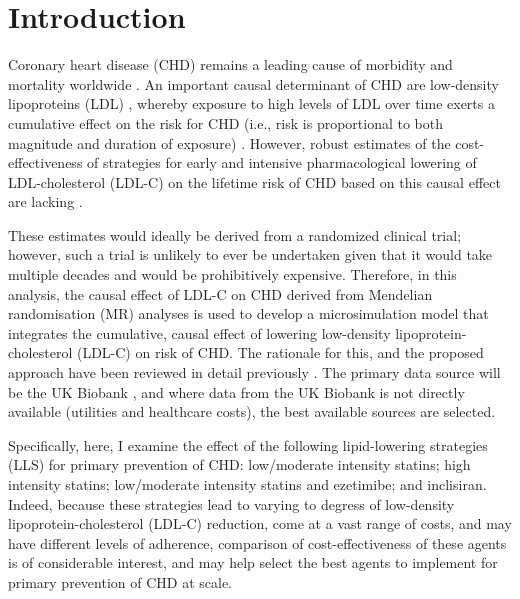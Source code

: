 \documentclass[11pt]{article}
\begin{document}
\pagebreak
\section{Introduction}

Coronary heart disease (CHD) remains a leading cause of morbidity and mortality worldwide \cite{RothJACC2020}.
An important causal determinant of CHD are low-density lipoproteins (LDL) \cite{FerenceEHJ2017}, 
whereby exposure to high levels of LDL over time exerts a cumulative effect on the risk for CHD 
(i.e., risk is proportional to both magnitude and duration of exposure) \cite{FerenceJAMA2019}.
However, robust estimates of the cost-effectiveness of strategies 
for early and intensive pharmacological lowering of LDL-cholesterol (LDL-C) on the lifetime 
risk of CHD based on this causal effect are lacking \cite{AdemiPE2022}. 

These estimates would ideally be derived from a randomized clinical trial; 
however, such a trial is unlikely to ever be undertaken given that it would 
take multiple decades and would be prohibitively expensive. 
Therefore, in this analysis, the causal effect of LDL-C on CHD derived from 
Mendelian randomisation (MR) analyses is used to develop a microsimulation model that integrates
the cumulative, causal effect of lowering low-density lipoprotein-cholesterol (LDL-C) on risk of CHD. 
The rationale for this, and the proposed approach have been reviewed in detail previously
\cite{AdemiPE2022}. The primary data source will be the UK Biobank 
\cite{SudlowPLOSMED2015}, and where data from the UK Biobank is not directly available (utilities and
healthcare costs), the best available sources are selected. 

Specifically, here, I examine the effect of the following lipid-lowering strategies (LLS) for primary
prevention of CHD: low/moderate intensity statins; high intensity statins; low/moderate intensity statins 
and ezetimibe; and inclisiran. Indeed, because these strategies
lead to varying to degress of low-density lipoprotein-cholesterol (LDL-C) reduction, come at a vast range of costs, 
and may have different levels of adherence, comparison of cost-effectiveness
of these agents is of considerable interest, and may help select the best agents to implement for primary
prevention of CHD at scale. 
\end{document}
